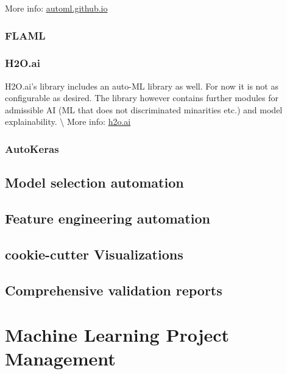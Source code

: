 \documentclass[
]{book}
\begin{document}
More info: \href{https://automl.github.io/auto-sklearn/master/index.html}{automl.github.io}

\hypertarget{flaml}{%
\subsection{FLAML}\label{flaml}}

\hypertarget{h2o.ai}{%
\subsection{H2O.ai}\label{h2o.ai}}

H2O.ai's library includes an auto-ML library as well. For now it is not as configurable as desired. The library however contains further modules for admissible AI (ML that does not discriminated minarities etc.) and model explainability. \textbackslash{}
More info: \href{https://docs.h2o.ai/h2o/latest-stable/h2o-docs/automl.html}{h2o.ai}

\hypertarget{autokeras}{%
\subsection{AutoKeras}\label{autokeras}}

\hypertarget{model-selection-automation}{%
\section{Model selection automation}\label{model-selection-automation}}

\hypertarget{feature-engineering-automation}{%
\section{Feature engineering automation}\label{feature-engineering-automation}}

\hypertarget{cookie-cutter-visualizations}{%
\section{cookie-cutter Visualizations}\label{cookie-cutter-visualizations}}

\hypertarget{comprehensive-validation-reports}{%
\section{Comprehensive validation reports}\label{comprehensive-validation-reports}}

\hypertarget{machine-learning-project-management}{%
\chapter{Machine Learning Project Management}\label{machine-learning-project-management}}
\end{document}
